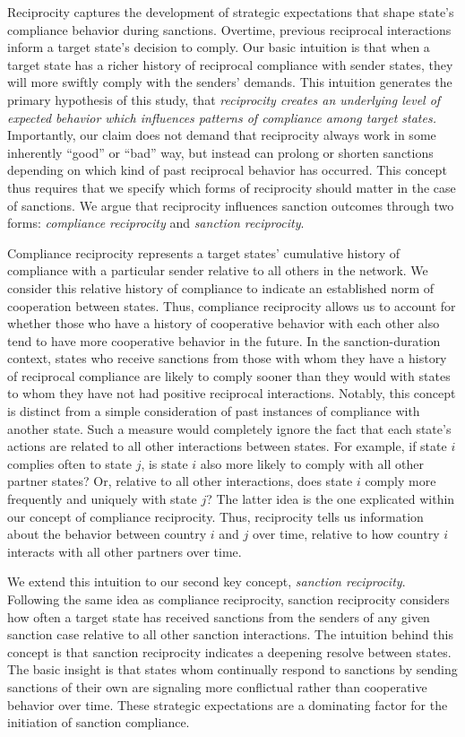 Reciprocity captures the development of strategic expectations that shape state's compliance behavior during sanctions. Overtime, previous reciprocal interactions inform a target state's decision to comply. Our basic intuition is that when a target state has a richer history of reciprocal compliance with sender states, they will more swiftly comply with the senders' demands. This intuition generates the primary hypothesis of this study, that \textit{reciprocity creates an underlying level of expected behavior which influences patterns of compliance among target states.} Importantly, our claim does not demand that reciprocity always work in some inherently ``good'' or ``bad'' way, but instead can prolong or shorten sanctions depending on which kind of past reciprocal behavior has occurred. This concept thus requires that we specify which forms of reciprocity should matter in the case of sanctions. We argue that reciprocity influences sanction outcomes through two forms: \textit{compliance reciprocity} and \textit{sanction reciprocity}. 

Compliance reciprocity represents a target states' cumulative history of compliance with a particular sender relative to all others in the network. We consider this relative history of compliance to indicate an established norm of cooperation between states. Thus, compliance reciprocity allows us to account for whether those who have a history of cooperative behavior with each other also tend to have more cooperative behavior in the future. In the sanction-duration context, states who receive sanctions from those with whom they have a history of reciprocal compliance are likely to comply sooner than they would with states to whom they have not had positive reciprocal interactions. Notably, this concept is distinct from a simple consideration of past instances of compliance with another state. Such a measure would completely ignore the fact that each state's actions are related to all other interactions between states. For example, if state $i$ complies often to state $j$, is state $i$ also more likely to comply with all other partner states? Or, relative to all other interactions, does state $i$ comply more frequently and uniquely with state $j$? The latter idea is the one explicated within our  concept of compliance reciprocity. Thus, reciprocity tells us information about the behavior between country $i$ and $j$ over time, relative to how country $i$ interacts with all other partners over time. 

We extend this intuition to our second key concept, \textit{sanction reciprocity}. Following the same idea as compliance reciprocity, sanction reciprocity considers how often a target state has received sanctions from the senders of any given sanction case relative to all other sanction interactions. The intuition behind this concept is that sanction reciprocity indicates a deepening resolve between states. The basic insight is that states whom continually respond to sanctions by sending sanctions of their own are signaling more conflictual rather than cooperative behavior over time. These strategic expectations are a dominating factor for the initiation of sanction compliance. 

